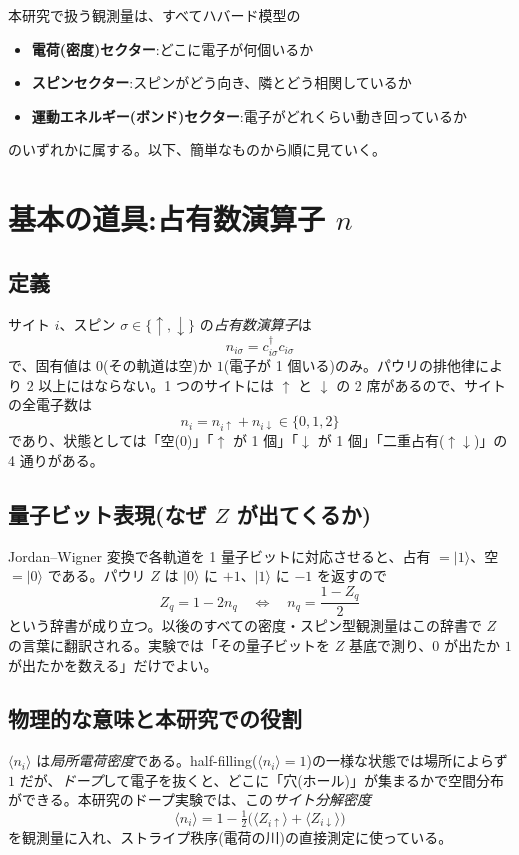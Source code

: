 \documentclass[11pt,a4paper]{ltjsarticle}
\newcommand{\ket}[1]{|#1\rangle}
\newcommand{\ev}[1]{\langle #1\rangle}
\newcommand{\cd}{c^\dagger}
\newcommand{\up}{\uparrow}
\newcommand{\dn}{\downarrow}
\begin{document}
本研究で扱う観測量は、すべてハバード模型の
\begin{itemize}
  \item \textbf{電荷(密度)セクター}:どこに電子が何個いるか
  \item \textbf{スピンセクター}:スピンがどう向き、隣とどう相関しているか
  \item \textbf{運動エネルギー(ボンド)セクター}:電子がどれくらい動き回っているか
\end{itemize}
のいずれかに属する。以下、簡単なものから順に見ていく。

\section{基本の道具:占有数演算子 $n$}
\label{sec:n}

\subsection{定義}
サイト $i$、スピン $\sigma\in\{\up,\dn\}$ の\emph{占有数演算子}は
\begin{equation}
  n_{i\sigma} = \cd_{i\sigma}c_{i\sigma}
\end{equation}
で、固有値は $0$(その軌道は空)か $1$(電子が 1 個いる)のみ。パウリの排他律により $2$ 以上にはならない。1 つのサイトには $\up$ と $\dn$ の 2 席があるので、サイトの全電子数は
\begin{equation}
  n_i = n_{i\up} + n_{i\dn} \in \{0,1,2\}
\end{equation}
であり、状態としては「空($0$)」「$\up$ が 1 個」「$\dn$ が 1 個」「二重占有($\up\dn$)」の 4 通りがある。

\subsection{量子ビット表現(なぜ $Z$ が出てくるか)}
Jordan--Wigner 変換で各軌道を 1 量子ビットに対応させると、占有 $=\ket1$、空 $=\ket0$ である。パウリ $Z$ は $\ket0$ に $+1$、$\ket1$ に $-1$ を返すので
\begin{equation}
  \boxed{\ Z_q = 1 - 2n_q\quad\Longleftrightarrow\quad n_q = \frac{1-Z_q}{2}\ }
  \label{eq:ZtoN}
\end{equation}
という辞書が成り立つ。以後のすべての密度・スピン型観測量はこの辞書で $Z$ の言葉に翻訳される。実験では「その量子ビットを $Z$ 基底で測り、$0$ が出たか $1$ が出たかを数える」だけでよい。

\subsection{物理的な意味と本研究での役割}
$\ev{n_i}$ は\emph{局所電荷密度}である。half-filling($\ev{n_i}=1$)の一様な状態では場所によらず $1$ だが、\emph{ドープ}して電子を抜くと、どこに「穴(ホール)」が集まるかで空間分布ができる。本研究のドープ実験では、この\emph{サイト分解密度}
\begin{equation}
  \ev{n_i} = 1 - \tfrac12\bigl(\ev{Z_{i\up}}+\ev{Z_{i\dn}}\bigr)
\end{equation}
を観測量に入れ、ストライプ秩序(電荷の川)の直接測定に使っている。
\end{document}
